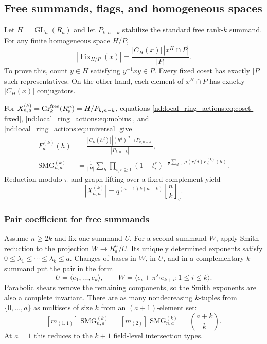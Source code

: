 \documentclass[10pt]{article}
\newcommand{\Fix}{\operatorname{Fix}}
\newcommand{\SMG}{\operatorname{SMG}}
\newcommand{\MGF}{\SMG}
\newcommand{\GL}{\operatorname{GL}}
\newcommand{\Gr}{\operatorname{Gr}}
\newcommand{\qbinom}[2]{\genfrac{[}{]}{0pt}{}{#1}{#2}_q}
\begin{document}
\subsection{Free summands, flags, and homogeneous spaces}

Let $H=\GL_n(R_a)$ and let $P_{k,n-k}$ stabilize the standard free
rank-$k$ summand.  For any finite homogeneous space $H/P$,
\begin{equation}\label{nd:local_ring_actions:eq:coset-fixed}
 |\Fix_{H/P}(x)|=\frac{|C_H(x)|\,|x^H\cap P|}{|P|}.
\end{equation}
To prove this, count $y\in H$ satisfying $y^{-1}xy\in P$.  Every fixed coset
has exactly $|P|$ such representatives.  On the other hand, each element of
$x^H\cap P$ has exactly $|C_H(x)|$ conjugators.

For $X^{(k)}_{n,a}=\Gr_k^{\rm free}(R_a^n)=H/P_{k,n-k}$, equations
\eqref{nd:local_ring_actions:eq:coset-fixed}, \eqref{nd:local_ring_actions:eq:mobius}, and \eqref{nd:local_ring_actions:eq:universal} give
\begin{align}
 F_d^{(k)}(h)
 &=\frac{|C_H(h^d)|\,|(h^d)^H\cap P_{k,n-k}|}{|P_{k,n-k}|},\label{nd:local_ring_actions:eq:grass-fixed}\\
 \MGF^{(k)}_{n,a}
 &=\frac1{|H|}\sum_h\prod_{i,r\ge1}
 (1-t_i^r)^{-\frac1r\sum_{d\mid r}\mu(r/d)F_d^{(k)}(h)}.
 \label{nd:local_ring_actions:eq:grass-smg}
\end{align}
Reduction modulo $\pi$ and graph lifting over a fixed complement yield
\[
 |X^{(k)}_{n,a}|=q^{(a-1)k(n-k)}\qbinom{n}{k}.
\]

\subsubsection{Pair coefficient for free summands}
Assume $n\ge2k$ and fix one summand $U$.  For a second summand $W$, apply
Smith reduction to the projection $W\to R_a^n/U$.  Its uniquely determined
exponents satisfy
$0\le\lambda_1\le\cdots\le\lambda_k\le a$.  Changes of bases in $W$, in
$U$, and in a complementary $k$-summand put the pair in the form
\[
 U=\langle e_1,\ldots,e_k\rangle,\qquad
 W=\langle e_i+\pi^{\lambda_i}e_{k+i}:1\le i\le k\rangle.
\]
Parabolic shears remove the remaining components, so the Smith exponents are
also a complete invariant.  There are as many nondecreasing $k$-tuples from
$\{0,\ldots,a\}$ as multisets of size $k$ from an $(a+1)$-element set:
\begin{equation}\label{nd:local_ring_actions:eq:grass-pair}
 \boxed{[m_{(1,1)}]\MGF^{(k)}_{n,a}
 =[m_{(2)}]\MGF^{(k)}_{n,a}=\binom{a+k}{k}.}
\end{equation}
At $a=1$ this reduces to the $k+1$ field-level intersection types.
\end{document}
